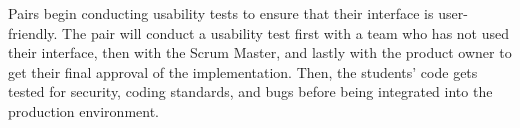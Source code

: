 

Pairs begin conducting usability tests \cite{usabilitytesting} to ensure that their interface is user-friendly. The pair will conduct a usability test first with a team who has not used their interface, then with the Scrum Master, and lastly with the product owner to get their final approval of the implementation. Then, the students' code gets tested for security, coding standards, and bugs before being integrated into the production environment. 



